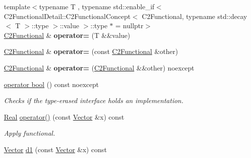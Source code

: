 \begin{DoxyCompactItemize}
\item 
{\footnotesize template$<$typename T , typename std\+::enable\+\_\+if$<$ C2\+Functional\+Detail\+::\+C2\+Functional\+Concept$<$ C2\+Functional, typename std\+::decay$<$ T $>$\+::type $>$\+::value $>$\+::type $\ast$  = nullptr$>$ }\\\hyperlink{classSpacy_1_1C2Functional}{C2\+Functional} \& {\bfseries operator=} (T \&\&value)\hypertarget{classSpacy_1_1C2Functional_ae5810a028be906128a2c982540fbbcae}{}\label{classSpacy_1_1C2Functional_ae5810a028be906128a2c982540fbbcae}

\item 
\hyperlink{classSpacy_1_1C2Functional}{C2\+Functional} \& {\bfseries operator=} (const \hyperlink{classSpacy_1_1C2Functional}{C2\+Functional} \&other)\hypertarget{classSpacy_1_1C2Functional_af65bf39553c61af917eed58cbe6ca7f3}{}\label{classSpacy_1_1C2Functional_af65bf39553c61af917eed58cbe6ca7f3}

\item 
\hyperlink{classSpacy_1_1C2Functional}{C2\+Functional} \& {\bfseries operator=} (\hyperlink{classSpacy_1_1C2Functional}{C2\+Functional} \&\&other) noexcept\hypertarget{classSpacy_1_1C2Functional_a19e885aded28dcc2c2e146031b08c4c6}{}\label{classSpacy_1_1C2Functional_a19e885aded28dcc2c2e146031b08c4c6}

\item 
\hyperlink{classSpacy_1_1C2Functional_a7305181d522d504c75c0647737fe7d15}{operator bool} () const noexcept
\begin{DoxyCompactList}\small\item\em Checks if the type-\/erased interface holds an implementation. \end{DoxyCompactList}\item 
\hyperlink{classSpacy_1_1Real}{Real} \hyperlink{classSpacy_1_1C2Functional_a5dad5f40836b6f43662db0a01fd32347}{operator()} (const \hyperlink{classSpacy_1_1Vector}{Vector} \&x) const \hypertarget{classSpacy_1_1C2Functional_a5dad5f40836b6f43662db0a01fd32347}{}\label{classSpacy_1_1C2Functional_a5dad5f40836b6f43662db0a01fd32347}

\begin{DoxyCompactList}\small\item\em Apply functional. \end{DoxyCompactList}\item 
\hyperlink{classSpacy_1_1Vector}{Vector} \hyperlink{classSpacy_1_1C2Functional_a7278ddf3337cc28d138a02d18ad44404}{d1} (const \hyperlink{classSpacy_1_1Vector}{Vector} \&x) const \hypertarget{classSpacy_1_1C2Functional_a7278ddf3337cc28d138a02d18ad44404}{}\label{classSpacy_1_1C2Functional_a7278ddf3337cc28d138a02d18ad44404}


\end{DoxyCompactItemize}

